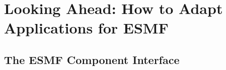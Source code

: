 
\section{Looking Ahead:  How to Adapt Applications for ESMF}
\label{sec:Adoption}

\subsection{The ESMF Component Interface}




























